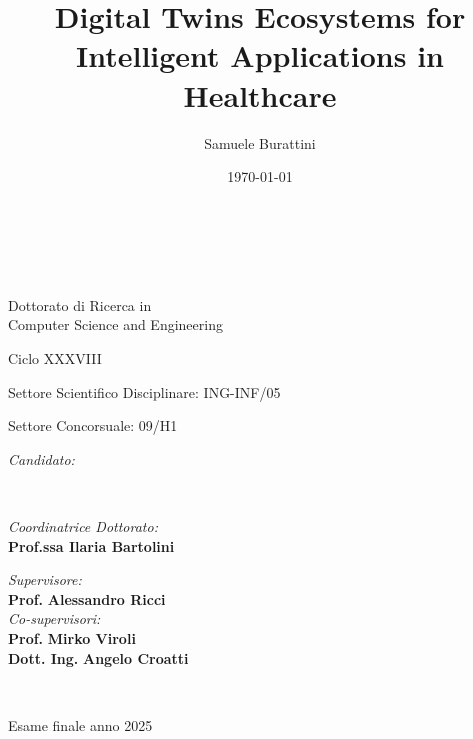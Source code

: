 \title{Digital Twins Ecosystems for Intelligent Applications in Healthcare}
\author{Samuele Burattini}
\date{\today}

\begin{titlepage}
	\begin{center}

		\large
		\textbf{\unibo \\ \disi}
		\\
		\noindent\hrulefill
		\vspace{0.4cm}

		\Large
		Dottorato di Ricerca in \\
		Computer Science and Engineering

		\vspace{0.4cm}

		Ciclo XXXVIII

		\vspace{0.4cm}

		Settore Scientifico Disciplinare: ING-INF/05

		Settore Concorsuale: 09/H1

		\Huge
		\vspace{3cm}
		\textbf{
			\thetitle
		}

		{\Large{
		\vspace{3cm}

		\textit{Candidato:\\}
		\centering
		\theauthor}
		\\}
		\large
		\vspace{2.5cm}
		\begin{minipage}[t]{0.49\textwidth}
			\begin{flushleft}
				\textit{Coordinatrice Dottorato:}
				\\
				\textbf{Prof.ssa Ilaria Bartolini}
			\end{flushleft}
		\end{minipage}
		\begin{minipage}[t]{0.5\textwidth}
			\begin{flushright}
				\textit{Supervisore:}
				\\
				\textbf{Prof.} \textbf{Alessandro Ricci}
				\\
				\vspace{0.4cm}
				\textit{Co-supervisori:}
				\\
				\textbf{Prof.} \textbf{Mirko Viroli}
				\\
				\textbf{Dott. Ing.} \textbf{Angelo Croatti}
			\end{flushright}

		\end{minipage}\\

		\vfill
		\noindent\hrulefill
		\vspace{0.3cm}
		\Large

		Esame finale anno 2025
	\end{center}
\end{titlepage}
\restoregeometry